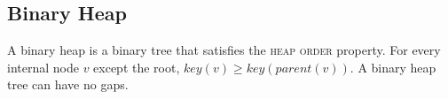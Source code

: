 \documentclass[landscape]{cheat}
\begin{document}
\begin{multicols}{3}
\subsection{Binary Heap}
A binary heap is a binary tree that satisfies the \textsc{heap order} property.
For every internal node $v$ except the root, $key(v) \geq key(parent(v))$.
A binary heap tree can have no gaps.

\end{multicols}
\end{document}
